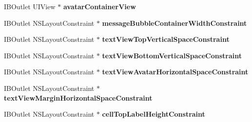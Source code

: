 \begin{DoxyCompactItemize}
\item 
\hypertarget{category_j_s_q_messages_collection_view_cell_07_08_a7210eee24e2c510d9082ea73a79c9ace}{}I\+B\+Outlet U\+I\+View $\ast$ {\bfseries avatar\+Container\+View}\label{category_j_s_q_messages_collection_view_cell_07_08_a7210eee24e2c510d9082ea73a79c9ace}

\item 
\hypertarget{category_j_s_q_messages_collection_view_cell_07_08_a99cde1b54b2b2cb5306ee95a682db041}{}I\+B\+Outlet N\+S\+Layout\+Constraint $\ast$ {\bfseries message\+Bubble\+Container\+Width\+Constraint}\label{category_j_s_q_messages_collection_view_cell_07_08_a99cde1b54b2b2cb5306ee95a682db041}

\item 
\hypertarget{category_j_s_q_messages_collection_view_cell_07_08_ad81a49c65604c431d5550779bbe59165}{}I\+B\+Outlet N\+S\+Layout\+Constraint $\ast$ {\bfseries text\+View\+Top\+Vertical\+Space\+Constraint}\label{category_j_s_q_messages_collection_view_cell_07_08_ad81a49c65604c431d5550779bbe59165}

\item 
\hypertarget{category_j_s_q_messages_collection_view_cell_07_08_a6c744bc7c9ae9ceffa895e9caa9d4f87}{}I\+B\+Outlet N\+S\+Layout\+Constraint $\ast$ {\bfseries text\+View\+Bottom\+Vertical\+Space\+Constraint}\label{category_j_s_q_messages_collection_view_cell_07_08_a6c744bc7c9ae9ceffa895e9caa9d4f87}

\item 
\hypertarget{category_j_s_q_messages_collection_view_cell_07_08_aebdde4cf2cf7ac3c1b48b103ff2c6543}{}I\+B\+Outlet N\+S\+Layout\+Constraint $\ast$ {\bfseries text\+View\+Avatar\+Horizontal\+Space\+Constraint}\label{category_j_s_q_messages_collection_view_cell_07_08_aebdde4cf2cf7ac3c1b48b103ff2c6543}

\item 
\hypertarget{category_j_s_q_messages_collection_view_cell_07_08_aaf99dc73dc76872fdec63de32f54d9d8}{}I\+B\+Outlet N\+S\+Layout\+Constraint $\ast$ {\bfseries text\+View\+Margin\+Horizontal\+Space\+Constraint}\label{category_j_s_q_messages_collection_view_cell_07_08_aaf99dc73dc76872fdec63de32f54d9d8}

\item 
\hypertarget{category_j_s_q_messages_collection_view_cell_07_08_aa4338251ab757c10daf270fe4eb29a48}{}I\+B\+Outlet N\+S\+Layout\+Constraint $\ast$ {\bfseries cell\+Top\+Label\+Height\+Constraint}\label{category_j_s_q_messages_collection_view_cell_07_08_aa4338251ab757c10daf270fe4eb29a48}


\end{DoxyCompactItemize}
